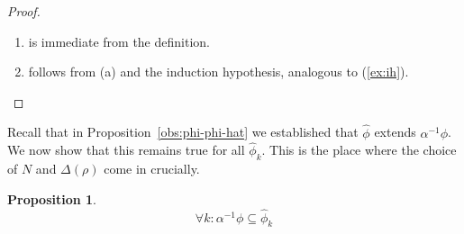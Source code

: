 \documentclass[sigplan,9pt]{acmart}\settopmatter{printfolios=true,printccs=false,printacmref=false}
\newcounter{thm}
\newcounter{theorem}
\theoremstyle{definition}
\newtheorem{prop}[thm]{Proposition}
\begin{document}
\begin{proof}
\begin{enumerate}
\item is immediate from the definition.

\item follows from (a) and the induction hypothesis, analogous to (\ref{ex:ih}).

\end{enumerate}
\end{proof}


Recall that in Proposition~\ref{obs:phi-phi-hat} we established that $\widehat{\phi}$ extends $\alpha^{-1} \phi$.
We now show that this remains true for all $\widehat{\phi}_k$.
This is the place where the choice of $N$ and $\Delta(\rho)$ come in crucially.



\begin{prop}\label{b:first}
\begin{equation}
 \forall k : \alpha^{-1} \phi \subseteq \widehat{\phi}_k
\end{equation}

\end{prop}
\end{document}
